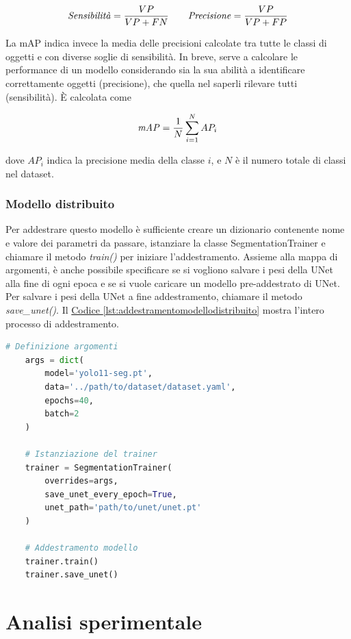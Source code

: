 \documentclass[12pt]{report}
\begin{document}
\[ \text{\textit{Sensibilità}} = \frac{VP}{VP + FN} \qquad \text{\textit{Precisione}} = \frac{VP}{VP + FP} \]

La mAP indica invece la media delle precisioni calcolate tra tutte le classi di oggetti e con diverse soglie di sensibilità. In breve, serve a calcolare le performance di un modello considerando sia la sua abilità a identificare correttamente oggetti (precisione), che quella nel saperli rilevare tutti (sensibilità). È calcolata come

\[ \text{\textit{mAP}} = \frac{1}{N} \sum_{i=1}^{N} AP_i \]

dove $AP_i$ indica la precisione media della classe $i$, e $N$ è il numero totale di classi nel dataset.

\subsection{Modello distribuito}
\label{sec:addestramento_encoder_decoder}

Per addestrare questo modello è sufficiente creare un dizionario contenente nome e valore dei parametri da passare, istanziare la classe SegmentationTrainer e chiamare il metodo \textit{train()} per iniziare l'addestramento. Assieme alla mappa di argomenti, è anche possibile specificare se si vogliono salvare i pesi della UNet alla fine di ogni epoca e se si vuole caricare un modello pre-addestrato di UNet. Per salvare i pesi della UNet a fine addestramento, chiamare il metodo \textit{save\_unet()}. Il \hyperref[lst:addestramentomodellodistribuito]{Codice \ref{lst:addestramentomodellodistribuito}} mostra l'intero processo di addestramento.

\lstset{style=pythonstyle}
\begin{lstlisting}[language=Python, caption={Addestramento del modello distribuito.}, label={lst:addestramentomodellodistribuito}, float]
	# Definizione argomenti
	args = dict(
		model='yolo11-seg.pt',
		data='../path/to/dataset/dataset.yaml',
		epochs=40,
		batch=2
	)
	
	# Istanziazione del trainer
	trainer = SegmentationTrainer(
		overrides=args,
		save_unet_every_epoch=True,
		unet_path='path/to/unet/unet.pt'
	)
	
	# Addestramento modello
	trainer.train()
	trainer.save_unet()
\end{lstlisting}

\chapter{Analisi sperimentale}
\label{chap:analisi}
\end{document}

